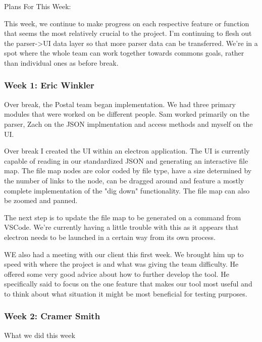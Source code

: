 Plans For This Week:

This week, we continue to make progress on each respective feature or function that seems the most relatively crucial to the project. I'm continuing to flesh out the parser->UI data layer so that more parser data can be transferred. We're in a spot where the whole team can work together towards commons goals, rather than individual ones as before break. \\ 

 \subsubsection{Week 1: Eric Winkler}

Over break, the Postal team began implementation. We had three primary modules that were worked on be different people. Sam worked primarily on the parser, Zach on the JSON implmentation and access methods and myself on the UI.



Over break I created the UI within an electron application. The UI is currently capable of reading in our standardized JSON and generating an interactive file map. The file map nodes are color coded by file type, have a size determined by the number of links to the node, can be dragged around and feature a mostly complete implementation of the "dig down" functionality. The file map can also be zoomed and panned.



The next step is to update the file map to be generated on a command from VSCode. We're currently having a little trouble with this as it appears that electron needs to be launched in a certain way from its own process.



WE also had a meeting with our client this first week. We brought him up to speed with where the project is and what was giving the team difficulty. He offered some very good advice about how to further develop the tool. He specifically said to focus on the one feature that makes our tool most useful and to think about what situation it might be most beneficial for testing purposes. \\ 

 \subsubsection{Week 2: Cramer Smith}

What we did this week



